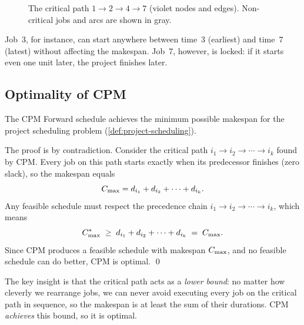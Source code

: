 \begin{example}
\begin{figure}[H]
\caption{The critical path $1 \to 2 \to 4 \to 7$
         (violet nodes and edges).
         Non-critical jobs and arcs are shown in gray.}
\label{fig:critical-path}
\end{figure}

\noindent
Job~3, for instance, can start anywhere between time~3 (earliest)
and time~7 (latest) without affecting the makespan.
Job~7, however, is locked: if it starts even one unit later, the
project finishes later.
\end{example}


\subsection{Optimality of CPM}
\label{ssec:cpm-optimality}

\begin{theorem}
\label{thm:cpm-optimal}
The CPM Forward schedule achieves the minimum possible makespan
for the project scheduling problem
(\cref{def:project-scheduling}).
\end{theorem}

\begin{formaldetails}
The proof is by contradiction.
Consider the critical path $i_1 \to i_2 \to \cdots \to i_k$
found by CPM\@.
Every job on this path starts exactly when its predecessor
finishes (zero slack), so the makespan equals
\[
  C_{\max} = d_{i_1} + d_{i_2} + \cdots + d_{i_k}.
\]
Any feasible schedule must respect the precedence chain
$i_1 \to i_2 \to \cdots \to i_k$, which means
\[
  C_{\max}^* \;\ge\; d_{i_1} + d_{i_2} + \cdots + d_{i_k}
          \;=\; C_{\max}.
\]
Since CPM produces a feasible schedule with makespan $C_{\max}$,
and no feasible schedule can do better, CPM is optimal.
\qed
\end{formaldetails}

The key insight is that the critical path acts as a
\emph{lower bound}: no matter how cleverly we rearrange jobs,
we can never avoid executing every job on the critical path
in sequence, so the makespan is at least the sum of their
durations.  CPM \emph{achieves} this bound, so it is optimal.


